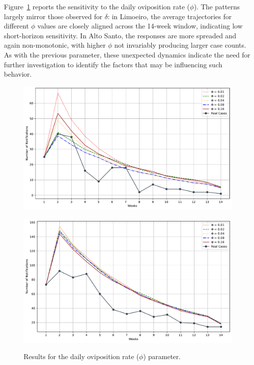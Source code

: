 Figure~\ref{fig:sensitivity-analysis-phi} reports the sensitivity to the daily oviposition rate ($\phi$). The patterns largely mirror those observed for $\delta$: in Limoeiro, the average trajectories for different $\phi$ values are closely aligned across the 14-week window, indicating low short-horizon sensitivity. In Alto Santo, the responses are more spreaded and again non-monotonic, with higher $\phi$ not invariably producing larger case counts. As with the previous parameter, these unexpected dynamics indicate the need for further investigation to identify the factors that may be influencing such behavior.



\begin{figure}[h!]
    \begin{minipage}[c]{.45\textwidth}
      \centering
      \includegraphics[scale=0.3]{images/parameters-experiments/AS_2017-01-15_mosquitoes_oviposition_rate.pdf} \\
    \end{minipage}
    \hspace{0.5cm}
    \begin{minipage}[c]{.45\textwidth}
        \centering
        \includegraphics[scale=0.3]{images/parameters-experiments/LN_2020-07-19_mosquitoes_oviposition_rate.pdf} \\
    \end{minipage}
    \caption{\label{fig:sensitivity-analysis-phi} Results for the daily oviposition rate ($\phi$) parameter.}
\end{figure}

